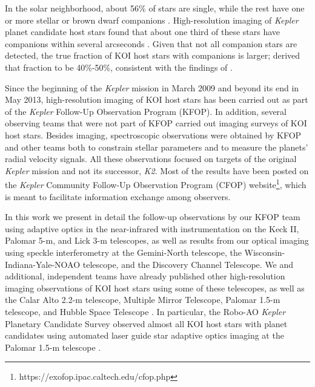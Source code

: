 \documentclass[twocolumn,appendixfloats]{aastex6}
\begin{document}
In the solar neighborhood, about 56\% of stars are single, while the rest have one 
or more stellar or brown dwarf companions \citep{raghavan10}. High-resolution 
imaging of {\it Kepler} planet candidate host stars found that about one third of 
these stars have companions within several arcseconds \citep{adams12,adams13,
dressing14,lillo-box14}. Given that not all companion stars are detected, the true 
fraction of KOI host stars with companions is larger; \citet{horch14} derived that 
fraction to be 40\%-50\%, consistent with the findings of \citet{raghavan10}.

Since the beginning of the {\it Kepler} mission in March 2009 and beyond its end
in May 2013, high-resolution imaging of KOI host stars has been carried out as 
part of the {\it Kepler} Follow-Up Observation Program (KFOP). In addition, 
several observing teams that were not part of KFOP carried out imaging surveys 
of KOI host stars. Besides imaging, spectroscopic observations were obtained 
by KFOP and other teams both to constrain stellar parameters and to measure 
the planets' radial velocity signals. All these observations focused on targets of 
the original {\it Kepler} mission and not its successor, {\it K2}. Most of the 
results have been posted on the {\it Kepler} Community Follow-Up Observation 
Program (CFOP) website\footnote{https://exofop.ipac.caltech.edu/cfop.php},
which is meant to facilitate information exchange among observers.

In this work we present in detail the follow-up observations by our KFOP team
using adaptive optics in the near-infrared with instrumentation on the Keck II, 
Palomar 5-m, and Lick 3-m telescopes, as well as results from our optical 
imaging using speckle interferometry at the Gemini-North telescope, the 
Wisconsin-Indiana-Yale-NOAO telescope, and the Discovery Channel Telescope. 
We and additional, independent teams have already published other high-resolution 
imaging observations of KOI host stars using some of these telescopes, as well as 
the Calar Alto 2.2-m telescope, Multiple Mirror Telescope, 
Palomar 1.5-m telescope, and Hubble Space Telescope \citep{howell11, adams12, 
lillo-box12, adams13, law14, dressing14, lillo-box14, wang14, gilliland15, everett15, 
cartier15, wang15a, wang15b, kraus16, baranec16, ziegler16}. In particular, the 
Robo-AO {\it Kepler} Planetary Candidate Survey observed almost all KOI host 
stars with planet candidates using automated laser guide star adaptive optics 
imaging at the Palomar 1.5-m telescope \citep{baranec14, law14, baranec16, 
ziegler16}.
\end{document}
